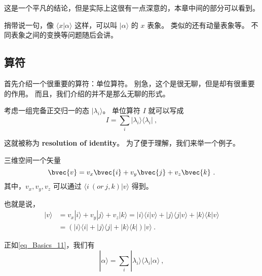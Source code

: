 这是一个平凡的结论，但是实际上这很有一点深意的，本章中间的部分可以看到。

捎带说一句，像 $\langle x|\alpha\rangle$ 这样，可以叫 $|\alpha \rangle$ 的 $x$ 表象。 类似的还有动量表象等。 不同表象之间的变换等问题随后会讲。

\subsection{算符}

首先介绍一个很重要的算符：单位算符。 别急，这个是很无聊，但是却有很重要的作用。 而且，我们介绍的并不是那么无聊的形式。

考虑一组完备正交归一的态 $|\lambda_i\rangle$。 单位算符 $I$ 就可以写成
\begin{equation}\label{eq_Basics_11}
I = \sum_i |\lambda_i\rangle\langle\lambda_i|~,
\end{equation}

这就被称为 \textbf{resolution of identity}。 为了便于理解，我们来举一个例子。

\begin{example}{}
三维空间一个矢量
\begin{equation}
\bvec{v} = v_x\bvec{i} + v_y\bvec{j} + v_z \bvec{k} ~.
\end{equation}
其中，$v_x, v_y, v_z$ 可以通过 $\langle i\ (or\ j, k)|v\rangle$ 得到。

也就是说，
\begin{equation}
\begin{split}
|v\rangle &= v_x|i\rangle + v_y|j\rangle + v_z|k\rangle = |i\rangle\langle i|v\rangle + |j\rangle\langle j|v\rangle + |k\rangle\langle k|v\rangle\\ &= (|i\rangle\langle i|+|j\rangle\langle j|+|k\rangle\langle k|)|v\rangle~.
\end{split}
\end{equation}
\end{example}{}
正如\autoref{eq_Basics_11}，我们有
\begin{equation}
|\alpha\rangle = \sum_i |\lambda_i\rangle\langle\lambda_i|\alpha\rangle~,
\end{equation}


